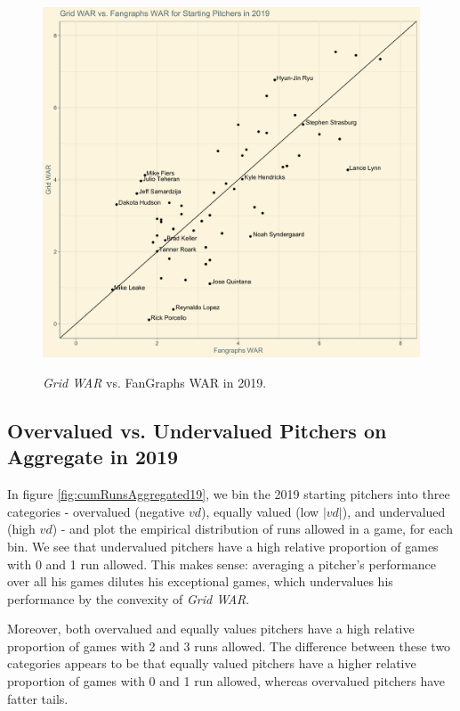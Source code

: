 \documentclass[12pt]{article}
\begin{document}
\begin{figure}[t!]
\centering
\caption{\textit{Grid WAR} vs. FanGraphs WAR in 2019.} %
\includegraphics[width=15cm]{../writeup_plots/plot_gwar_vs_fwar_2019.png}
\label{fig:gwarVfwar19}
\end{figure}

\subsection{Overvalued vs. Undervalued Pitchers on Aggregate in 2019}

In figure \ref{fig:cumRunsAggregated19}, we bin the 2019 starting pitchers into three categories - overvalued (negative $vd$), equally valued (low $|vd|$), and undervalued (high $vd$) - and plot the empirical distribution of runs allowed in a game, for each bin. We see that undervalued pitchers have a high relative proportion of games with 0 and 1 run allowed. This makes sense: averaging a pitcher's performance over all his games dilutes his exceptional games, which undervalues his performance by the convexity of \textit{Grid WAR}.

Moreover, both overvalued and equally values pitchers have a high relative proportion of games with 2 and 3 runs allowed. The difference between these two categories appears to be that equally valued pitchers have a higher relative proportion of games with 0 and 1 run allowed, whereas overvalued pitchers have fatter tails.
\end{document}
